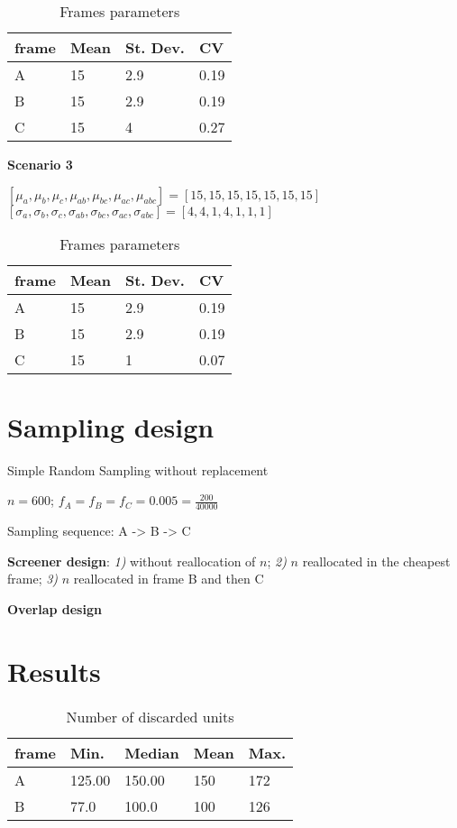 \documentclass[11pt,a4paper]{article}
\begin{document}
\begin{table}[]
\centering
\caption{Frames parameters}
\label{my-label}
\begin{tabular}{l|lll}
\hline
frame & Mean & St. Dev. & CV \\
\hline
A & 15  & 2.9  & 0.19  \\
B & 15  & 2.9 & 0.19 \\
C & 15  & 4 & 0.27 \\
\end{tabular}
\end{table}

\textbf{Scenario 3}
 
$[\mu_a, \mu_b, \mu_c, \mu_{ab}, \mu_{bc}, \mu_{ac}, \mu_{abc}] = [15, 15, 15, 15, 15, 15, 15]$     \\
$[\sigma_a, \sigma_b, \sigma_c, \sigma_{ab}, \sigma_{bc}, \sigma_{ac}, \sigma_{abc}] = [4,4,1,4,1,1,1]$ 

\begin{table}[]
\centering
\caption{Frames parameters}
\label{my-label}
\begin{tabular}{l|lll}
\hline
frame & Mean & St. Dev. & CV \\
\hline
A & 15  & 2.9  & 0.19  \\
B & 15  & 2.9 & 0.19 \\
C & 15  & 1 & 0.07 \\
\end{tabular}
\end{table}


\section{Sampling design}

Simple Random Sampling without replacement

$n = 600$; $f_A = f_B = f_C = 0.005 = \frac{200}{40000}$

Sampling sequence: A -> B -> C

\textbf{Screener design}: \textit{1)} without reallocation of $n$; \textit{2)} $n$ reallocated in the cheapest frame; \textit{3)} $n$ reallocated in frame B and then C


\textbf{Overlap design}

\section{Results}


\begin{table}[]
\centering
\caption{Number of discarded units}
\label{my-label}
\begin{tabular}{l|llll}
\hline
frame & Min. & Median &   Mean  &   Max. \\
\hline
A &  125.00 & 150.00 &  150 &    172 \\
B & 77.0   & 100.0  &  100  &  126 \\
\end{tabular}
\end{table}
\end{document}
